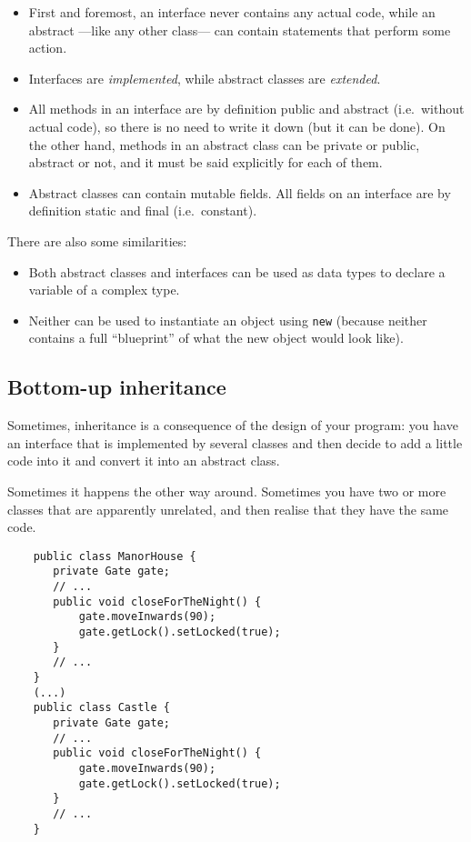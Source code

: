 \begin{itemize}
\item First and foremost, an interface never contains any actual code,
  while an abstract ---like any other class--- can contain statements
  that perform some action.
\item Interfaces are \emph{implemented}, while abstract classes are
  \emph{extended}.
\item All methods in an interface are by definition public and
  abstract (i.e.~without actual code), so there is no need to write it
  down (but it can be done). On the other hand, methods in an abstract
  class can be private or public, abstract or not, and it must be said
  explicitly for each of them.
\item Abstract classes can contain mutable fields. All fields on an
  interface are by definition static and final (i.e.~constant).
\end{itemize}

There are also some similarities: 

\begin{itemize}
\item Both abstract classes and interfaces can be used as data
  types to declare a variable of a complex type.
\item Neither can be used to instantiate an object using \verb+new+
  (because neither contains a full ``blueprint'' of what the new
  object would look like). 
\end{itemize}

\subsection{Bottom-up inheritance}
\label{sec:boot-up-inher}

Sometimes, inheritance is a consequence of the design of your
program: you have an interface that is implemented by several classes
and then decide to add a little code into it and convert it into an
abstract class. 

Sometimes it happens the other way around. Sometimes you have two or
more classes that are apparently unrelated, and then realise that they
have the same code. 

\begin{verbatim}
    public class ManorHouse {
       private Gate gate;
       // ...
       public void closeForTheNight() {
           gate.moveInwards(90);
           gate.getLock().setLocked(true);
       }
       // ...
    }
    (...)
    public class Castle {
       private Gate gate;
       // ...
       public void closeForTheNight() {
           gate.moveInwards(90);
           gate.getLock().setLocked(true);
       }
       // ...
    }       
\end{verbatim}

